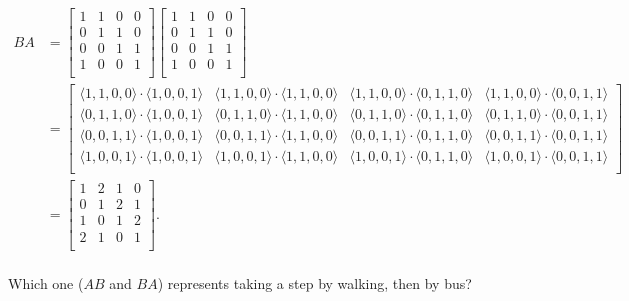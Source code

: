 \documentclass[../gatm_answers.tex]{subfiles}
\begin{document}
\begin{align*}
BA &= \begin{bmatrix}
1 & 1 & 0 & 0 \\
0 & 1 & 1 & 0 \\
0 & 0 & 1 & 1 \\
1 & 0 & 0 & 1 \\
\end{bmatrix}\begin{bmatrix}
1 & 1 & 0 & 0 \\
0 & 1 & 1 & 0 \\
0 & 0 & 1 & 1 \\
1 & 0 & 0 & 1 \\
\end{bmatrix} \\
&= \begin{bmatrix}
\langle1,1,0,0\rangle\cdot \langle 1,0,0,1\rangle & \langle1,1,0,0\rangle\cdot \langle 1,1,0,0\rangle & \langle1,1,0,0\rangle\cdot \langle 0,1,1,0\rangle & \langle1,1,0,0\rangle\cdot \langle 0,0,1,1\rangle \\
\langle0,1,1,0\rangle\cdot \langle 1,0,0,1\rangle & \langle0,1,1,0\rangle\cdot \langle 1,1,0,0\rangle & \langle0,1,1,0\rangle\cdot \langle 0,1,1,0\rangle & \langle0,1,1,0\rangle\cdot \langle 0,0,1,1\rangle \\
\langle0,0,1,1\rangle\cdot \langle 1,0,0,1\rangle & \langle0,0,1,1\rangle\cdot \langle 1,1,0,0\rangle & \langle0,0,1,1\rangle\cdot \langle 0,1,1,0\rangle & \langle0,0,1,1\rangle\cdot \langle 0,0,1,1\rangle \\
\langle1,0,0,1\rangle\cdot \langle 1,0,0,1\rangle & \langle1,0,0,1\rangle\cdot \langle 1,1,0,0\rangle & \langle1,0,0,1\rangle\cdot \langle 0,1,1,0\rangle & \langle1,0,0,1\rangle\cdot \langle 0,0,1,1\rangle \\
\end{bmatrix} \\
&= \begin{bmatrix}
1 & 2 & 1 & 0 \\
0 & 1 & 2 & 1 \\
1 & 0 & 1 & 2 \\
2 & 1 & 0 & 1 \\
\end{bmatrix}. \\
\end{align*}

\begin{inner_problem}
\item Which one ($AB$ and $BA$) represents taking a step by walking, then by bus?
\end{inner_problem}
\end{document}
